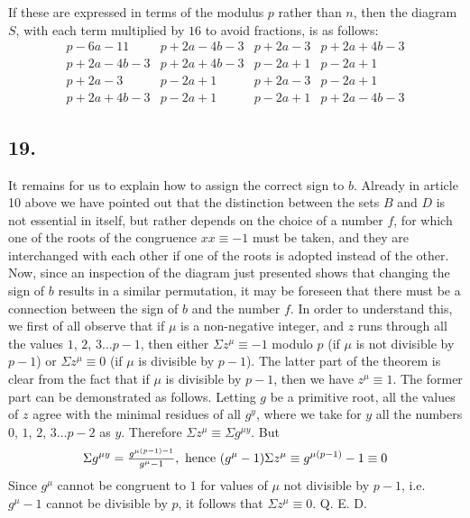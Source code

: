 \documentclass[twoside,12pt]{memoir}
\let\oldfrac\frac
\def\frac#1#2{\mathchoice{\tfrac{#1}{#2}}{\oldfrac{#1}{#2}}{\genfrac{}{}{}{2}{#1}{#2\mathstrut}}{\genfrac{}{}{}{3}{#1}{#2\mathstrut}}}
\begin{document}
If these are expressed in terms of the modulus \(p\) rather than \(n\), then the diagram \({S}\), with each term multiplied by \(16\) to avoid fractions, is as follows:
\[\begin{array}{l|l|l|l}
p-6 a-11 & p+2 a-4 b-3 & p+2 a-3 & p+2 a+4 b-3 \\
p+2 a-4 b-3 & p+2 a+4 b-3 & p-2 a+1 & p-2 a+1 \\
p+2 a-3 & p-2 a+1 & p+2 a-3 & p-2 a+1 \\
p+2 a+4 b-3 & p-2 a+1 & p-2 a+1 & p+2 a-4 b-3
\end{array}
\]
%

\subsection*{19.}
It remains for us to explain how to assign the correct sign to \(b\). Already in article 10 above we have pointed out that the distinction between the sets \(B\) and \(D\) is not essential in itself, but rather depends on the choice of a number \(f\), for which one of the roots of the congruence \(x x \equiv-1\) must be taken, and they are interchanged with each other if one of the roots is adopted instead of the other. Now, since an inspection of the diagram just presented shows that changing the sign of \(b\) results in a similar permutation, it may be foreseen that there must be a connection between the sign of \(b\) and the number \(f\). In order to understand this, we first of all observe that if \(\mu\) is a non-negative integer, and \(z\) runs through all the values \(1\), \(2\), \(3 \ldots p-1\), then either \(\Sigma z^{\mu} \equiv -1\) modulo \(p\) (if \(\mu\) is not divisible by \(p-1\)) or \(\Sigma z^{\mu} \equiv 0\) (if \(\mu\) is divisible by \(p-1\)). The latter part of the theorem is clear from the fact that if \(\mu\) is divisible by \(p-1\), then we have \(z^{\mu} \equiv 1\). The former part can be demonstrated as follows. Letting \(g\) be a primitive root, all the values of \(z\) agree with the minimal residues of all \(g^{y}\), where we take for \(y\) all the numbers \(0\), \(1\), \(2\), \(3 \ldots p-2\) as \(y\). Therefore \(\Sigma z^{\mu} \equiv \Sigma g^{\mu y}\). But 
\[\Sigma g^{\mu y}=\frac{g^{\mu(p-1)-1}}{g^{\mu}-1}, \text{ hence } (g^{\mu}-1) \Sigma z^{\mu} \equiv g^{\mu(p-1)}-1 \equiv 0\]
Since \(g^{\mu}\) cannot be congruent to \(1\) for values of \(\mu\) not divisible by \(p-1\), i{.}e{.} \(g^{\mu}-1\) cannot be divisible by \(p\), it follows that \(\Sigma z^{\mu} \equiv 0\). Q. E. D.
%
\end{document}
